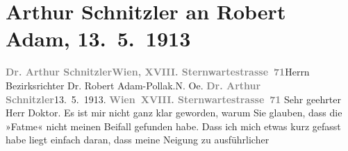 

         
         \renewcommand{\erwaehntePersonen}{Personen: Robert Adam}
         \renewcommand{\erwaehnteOrte}{Orte: Niederösterreich, Sternwartestraße, Wien, Zistersdorf}
         \renewcommand{\erwaehnteWerke}{Werke: Fatme}
               \section[Arthur Schnitzler an Robert Adam, 13. 5. 1913]{ Arthur Schnitzler an Robert Adam, 13. 5. 1913}\nopagebreak{}\rehead{ }\begin{ledgroupsized}[t]{13cm}\normalsize\beginnumbering \toendnotes[C]{\smallbreak\pagebreak[2]} 
\toendnotes[C]{\smallbreak}\pstart{}{\pb}\textcolor{gray}{\textbf{Dr. Arthur Schnitzler}}\pend{}\pstart{}\textcolor{gray}{\textbf{Wien, XVIII. Sternwartestrasse 71}}\pend{}{\bigskip}\pstart{}{\pb}Herrn Bezirksrichter \pend{}\pstart{}Dr. Robert Adam-Pollak\pend{}\pstart{}.\pend{}\pstart{}N. Oe.\pend{}{\bigskip}\pstart
           {\pb}\textcolor{gray}{\textbf{Dr. Arthur Schnitzler}}\hfill 13. 5. 1913.\pend
           \pstart
           \textcolor{gray}{\textbf{Wien XVIII. Sternwartestrasse 71}}\pend
           \pstart\center{}Sehr geehrter Herr Doktor.\pend\pstart
           Es ist mir nicht ganz klar geworden, warum Sie glauben, dass die »Fatme« nicht meinen Beifall gefunden habe. Dass ich mich etwas
               kurz gefasst habe liegt einfach daran, dass meine Neigung zu ausführlicher

\end{ledgroupsized}
